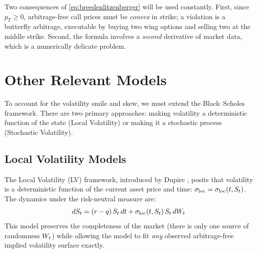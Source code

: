 Two consequences of \eqref{eq:breedenlitzenberger} will be used constantly. First, since 
$p_T \geq 0$, arbitrage-free call prices must be \emph{convex} in strike; a violation is a 
butterfly arbitrage, executable by buying two wing options and selling two at the middle strike. 
Second, the formula involves a \emph{second} derivative of market data, which is a numerically 
delicate problem.


\section{Other Relevant Models}\label{sec:othermodels}

To account for the volatility smile and skew, we must extend the Black--Scholes framework. There are two primary approaches: making volatility a deterministic function of the state (Local Volatility) or making it a stochastic process (Stochastic Volatility).

\subsection{Local Volatility Models}\label{subsec:localvol}

The Local Volatility (LV) framework, introduced by Dupire \cite{dupire1994}, posits that volatility is a deterministic function of the current asset price and time: $\sigma_{\mathrm{loc}} = \sigma_{\mathrm{loc}}(t,S_t)$. The dynamics under the risk-neutral measure are:
\begin{equation}\label{eq:localvolspot}
    dS_t = (r-q)\,S_t\,dt + \sigma_{\mathrm{loc}}(t,S_t)\,S_t\,dW_t
\end{equation}
This model preserves the completeness of the market (there is only one source of randomness $W_t$) while allowing the model to fit \textit{any} observed arbitrage-free implied volatility surface exactly.


